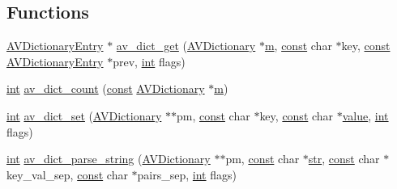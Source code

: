 \subsection*{Functions}
\begin{DoxyCompactItemize}
\item 
\hyperlink{struct_a_v_dictionary_entry}{A\+V\+Dictionary\+Entry} $\ast$ \hyperlink{group__lavu__dict_ga8140aee3afe5d5ccdf2d4a5eabb4a710}{av\+\_\+dict\+\_\+get} (\hyperlink{group__lavu__dict_ga1d7cc0833bee918994a600556410315f}{A\+V\+Dictionary} $\ast$\hyperlink{layer3_8c_a4b8bfe70f28d6faddcb10d6ecf8c1989}{m}, \hyperlink{getopt1_8c_a2c212835823e3c54a8ab6d95c652660e}{const} char $\ast$key, \hyperlink{getopt1_8c_a2c212835823e3c54a8ab6d95c652660e}{const} \hyperlink{struct_a_v_dictionary_entry}{A\+V\+Dictionary\+Entry} $\ast$prev, \hyperlink{xmltok_8h_a5a0d4a5641ce434f1d23533f2b2e6653}{int} flags)
\item 
\hyperlink{xmltok_8h_a5a0d4a5641ce434f1d23533f2b2e6653}{int} \hyperlink{group__lavu__dict_gad21456d6601aa096c7c78dce8848d50a}{av\+\_\+dict\+\_\+count} (\hyperlink{getopt1_8c_a2c212835823e3c54a8ab6d95c652660e}{const} \hyperlink{group__lavu__dict_ga1d7cc0833bee918994a600556410315f}{A\+V\+Dictionary} $\ast$\hyperlink{layer3_8c_a4b8bfe70f28d6faddcb10d6ecf8c1989}{m})
\item 
\hyperlink{xmltok_8h_a5a0d4a5641ce434f1d23533f2b2e6653}{int} \hyperlink{group__lavu__dict_ga8d9c2de72b310cef8e6a28c9cd3acbbe}{av\+\_\+dict\+\_\+set} (\hyperlink{group__lavu__dict_ga1d7cc0833bee918994a600556410315f}{A\+V\+Dictionary} $\ast$$\ast$pm, \hyperlink{getopt1_8c_a2c212835823e3c54a8ab6d95c652660e}{const} char $\ast$key, \hyperlink{getopt1_8c_a2c212835823e3c54a8ab6d95c652660e}{const} char $\ast$\hyperlink{lib_2expat_8h_a4a30a13b813682e68c5b689b45c65971}{value}, \hyperlink{xmltok_8h_a5a0d4a5641ce434f1d23533f2b2e6653}{int} flags)
\item 
\hyperlink{xmltok_8h_a5a0d4a5641ce434f1d23533f2b2e6653}{int} \hyperlink{group__lavu__dict_gaca5ff7c251e60bd13164d13c82f21b79}{av\+\_\+dict\+\_\+parse\+\_\+string} (\hyperlink{group__lavu__dict_ga1d7cc0833bee918994a600556410315f}{A\+V\+Dictionary} $\ast$$\ast$pm, \hyperlink{getopt1_8c_a2c212835823e3c54a8ab6d95c652660e}{const} char $\ast$\hyperlink{sndfile__save_8m_a4b99ff73a8a869319570237b5c57ab03}{str}, \hyperlink{getopt1_8c_a2c212835823e3c54a8ab6d95c652660e}{const} char $\ast$key\+\_\+val\+\_\+sep, \hyperlink{getopt1_8c_a2c212835823e3c54a8ab6d95c652660e}{const} char $\ast$pairs\+\_\+sep, \hyperlink{xmltok_8h_a5a0d4a5641ce434f1d23533f2b2e6653}{int} flags)

\end{DoxyCompactItemize}
